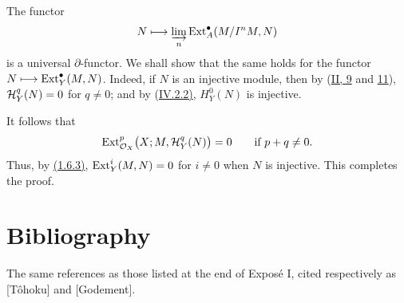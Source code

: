 The functor
\[
 N\longmapsto \varinjlim_n \operatorname{Ext}_A^{\bullet}(M/I^nM,N)
\]
is a universal $\partial$-functor. We shall show that the same holds for the
functor $N\longmapsto \operatorname{Ext}_Y^{\bullet}(M,N)$. Indeed, if $N$ is an injective
module, then by \textup{(\hyperref[II.9]{II, 9} and \hyperref[II.11]{11})}, $\mathcal H_Y^q(N)=0$ for $q\ne0$; and
by \textup{(\hyperref[IV.2.2]{IV.2.2)}}, $H_Y^0(N)$ is injective.

It follows that
\[
 \operatorname{Ext}_{\mathcal O_X}^{p}\bigl(X;M,\mathcal H_Y^q(N)\bigr)=0
 \qquad\text{if }p+q\ne0.
\]
Thus, by \hyperref[VI.1.6.3]{(1.6.3)}, $\operatorname{Ext}_Y^i(M,N)=0$ for $i\ne0$ when $N$ is injective. This
completes the proof.

\section*{Bibliography}
The same references as those listed at the end of Expos\'e I, cited
respectively as [T\^ohoku] and [Godement].
